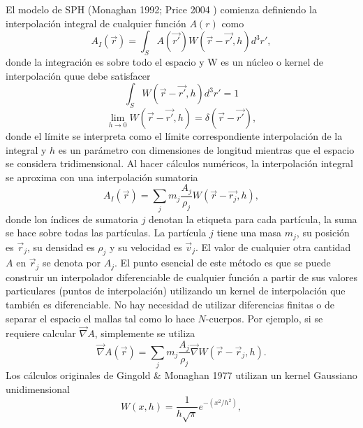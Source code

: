 \documentclass[a4paper,openright,10pt, oneside, final]{book}
\begin{document}
El modelo de SPH (Monaghan 1992; Price 2004 \cite{b8, b9}) comienza definiendo la interpolación integral de cualquier función $A(r)$ como
\begin{equation}
 A_{I}(\vec{r})
 =
 \int_{S} 
 A(\vec{r'})W(\vec{r}- \vec{r'}, h)d^{3}r',\label{eqn2.16}
\end{equation} 
donde la integración es sobre todo el espacio y W es un núcleo o kernel de interpolación quue debe satisfacer
\begin{equation}
 \int_{S}W(\vec{r}- \vec{r'},h)d^{3}r' = 1\label{eqn2.17}
\end{equation}
\begin{equation}
\lim_{h \to 0} W(\vec{r}-\vec{r'},h) = \delta(\vec{r}-\vec{r'}),\label{eqn2.18}
\end{equation}
donde el límite se interpreta como el límite correspondiente interpolación de la integral y $h$ es un parámetro con dimensiones de longitud mientras que el espacio se considera tridimensional. 
Al hacer cálculos numéricos, la interpolación integral se aproxima con una interpolación sumatoria
\begin{equation}
 A_{I}(\vec{r})
 =
 \sum_{j} m_{j} \frac{A_{j}}{\rho_{j}} W(\vec{r}- \vec{r_{j}},h),\label{eqn2.19}
\end{equation}
donde lon índices de sumatoria $j$ denotan la etiqueta para cada partícula, la suma se hace sobre todas las partículas. La partícula $j$ tiene una masa $m_{j}$, su posición es $\vec{r}_{j}$, su densidad es $\rho_{j}$ y su velocidad es $\vec{v}_{j}$. El valor de cualquier otra cantidad $A$ en $\vec{r}_{j}$ se denota por $A_{j}$. El punto esencial de este método es que se puede construir un interpolador diferenciable de cualquier función a partir de sus valores particulares (puntos de interpolación) utilizando un kernel de interpolación que también es diferenciable. No hay necesidad de utilizar diferencias finitas o de separar el espacio el mallas tal como lo hace $N$-cuerpos. Por ejemplo, si se requiere calcular $\vec{\nabla}A$, simplemente se utiliza
\begin{equation}
\vec{\nabla}A(\vec{r}) = 
\sum_{j} m_{j} \frac{A_{j}}{\rho_{j}} \vec{\nabla}W(\vec{r}-\vec{r}_{j}, h).\label{eqn 2.20}
\end{equation}
Los cálculos originales de Gingold \& Monaghan 1977 \cite{b9.1} utilizan un kernel Gaussiano unidimensional
\begin{equation}
  W(x,h)
  =
  \frac{1}{h \sqrt{\pi}} e^{-(x^{2}/h^{2})},\label{eqn2.21}
\end{equation}
\end{document}
